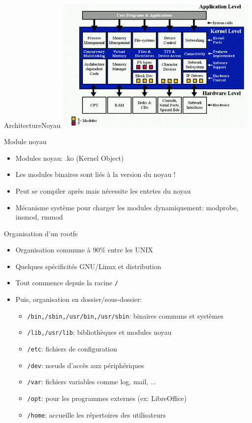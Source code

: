 \begin{frame}{Architecture}{Noyau}
  \includegraphics[width=10cm]{pictures/kernel_arch.png}
\end{frame}

\begin{frame}{Module noyau}
  \begin{itemize}
  \item Modules noyau: .ko (Kernel Object)
  \item Les modules binaires sont liés à la version du noyau !
  \item Peut se compiler après mais nécessite les entetes du noyau
  \item Mécanisme système pour charger les modules dynamiquement: modprobe, insmod, rmmod
  \end{itemize}
\end{frame}

\begin{frame}{Organisation d'un rootfs}
  \begin{itemize}
  \item Organisation commune à 90\% entre les UNIX
  \item Quelques spécificités GNU/Linux et distribution
  \item Tout commence depuis la racine \texttt{/}
  \item Puis, organisation en dossier/sous-dossier:
    \begin{itemize}
    \item \texttt{/bin,/sbin,/usr/bin,/usr/sbin}: binaires communs et systèmes
    \item \texttt{/lib,/usr/lib}: bibliothèques et modules noyau
    \item \texttt{/etc}: fichiers de configuration
    \item \texttt{/dev}: nœuds d'accès aux périphériques
    \item \texttt{/var}: fichiers variables comme log, mail, ...
    \item \texttt{/opt}: pour les programmes externes (ex: LibreOffice)
    \item \texttt{/home}: accueille les répertoires des utilisateurs
    \end{itemize}
  \end{itemize}
\end{frame}

